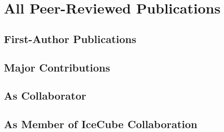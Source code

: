 \documentclass[a4paper,10pt]{article} %
\begin{document}

\section*{All Peer-Reviewed Publications}


\subsection*{First-Author Publications}

\begin{refsection}
	
	\nocite{*}
	\printbibliography[heading=none]
	
\end{refsection}

\subsection*{Major Contributions}

\begin{refsection}
	
	\nocite{*}
	\printbibliography[heading=none]
	
\end{refsection}

\subsection*{As Collaborator}

\begin{refsection}
	
	\nocite{*}
	\printbibliography[heading=none]
	
\end{refsection}

\subsection*{As Member of IceCube Collaboration}

\begin{refsection}[peer_ic]
	
	\nocite{*}
	\printbibliography[heading=none]
	
\end{refsection}
\end{document}
